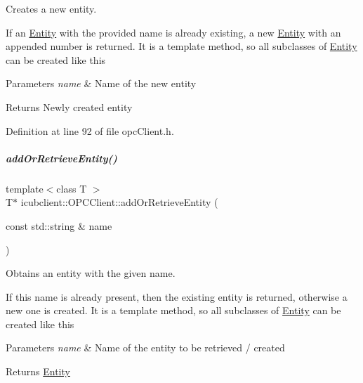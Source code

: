 Creates a new entity. 

If an \hyperlink{group__icubclient__representations_classicubclient_1_1Entity}{Entity} with the provided name is already existing, a new \hyperlink{group__icubclient__representations_classicubclient_1_1Entity}{Entity} with an appended number is returned. It is a template method, so all subclasses of \hyperlink{group__icubclient__representations_classicubclient_1_1Entity}{Entity} can be created like this 
\begin{DoxyParams}{Parameters}
{\em name} & Name of the new entity \\
\hline
\end{DoxyParams}
\begin{DoxyReturn}{Returns}
Newly created entity 
\end{DoxyReturn}


Definition at line 92 of file opc\+Client.\+h.

\mbox{\label{group__icubclient__clients_a4874ae1177b1f4a7aa5267428de3a8b7}} 
\subparagraph{\texorpdfstring{add\+Or\+Retrieve\+Entity()}{addOrRetrieveEntity()}}
{\footnotesize\ttfamily template$<$class T $>$ \\
T$\ast$ icubclient\+::\+O\+P\+C\+Client\+::add\+Or\+Retrieve\+Entity (\begin{DoxyParamCaption}\item[{const std\+::string \&}]{name }\end{DoxyParamCaption})\hspace{0.3cm}{\ttfamily [inline]}}



Obtains an entity with the given name. 

If this name is already present, then the existing entity is returned, otherwise a new one is created. It is a template method, so all subclasses of \hyperlink{group__icubclient__representations_classicubclient_1_1Entity}{Entity} can be created like this 
\begin{DoxyParams}{Parameters}
{\em name} & Name of the entity to be retrieved / created \\
\hline
\end{DoxyParams}
\begin{DoxyReturn}{Returns}
\hyperlink{group__icubclient__representations_classicubclient_1_1Entity}{Entity} 
\end{DoxyReturn}


